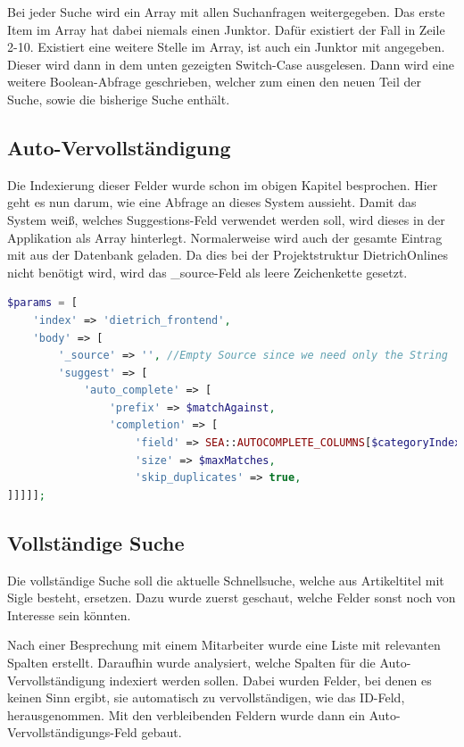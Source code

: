 Bei jeder Suche wird ein Array mit allen Suchanfragen weitergegeben. Das erste Item im Array hat dabei niemals einen Junktor. Dafür existiert der Fall in Zeile 2-10. Existiert eine weitere Stelle im Array, ist auch ein Junktor mit angegeben. Dieser wird dann in dem unten gezeigten Switch-Case ausgelesen. Dann wird eine weitere Boolean-Abfrage geschrieben, welcher zum einen den neuen Teil der Suche, sowie die bisherige Suche enthält.

\subsection{Auto-Vervollständigung}

Die Indexierung dieser Felder wurde schon im obigen Kapitel besprochen. Hier geht es nun darum, wie eine Abfrage an dieses System aussieht. Damit das System weiß, welches Suggestions-Feld verwendet werden soll, wird dieses in der Applikation als Array hinterlegt. Normalerweise wird auch der gesamte Eintrag mit aus der Datenbank geladen. Da dies bei der Projektstruktur DietrichOnlines nicht benötigt wird, wird das \_source-Feld als leere Zeichenkette gesetzt. \cite{ElasticsearchB.V..13.2.2020}


\begin{lstlisting}[language=PHP, frame=single, label={lst:autocompleParams}, caption=Auschnitt aus der Abfrage zur Auto-Vervollständigung,captionpos=b] 
$params = [
    'index' => 'dietrich_frontend',
    'body' => [
        '_source' => '', //Empty Source since we need only the String
        'suggest' => [
            'auto_complete' => [
                'prefix' => $matchAgainst,
                'completion' => [
                    'field' => SEA::AUTOCOMPLETE_COLUMNS[$categoryIndex],
                    'size' => $maxMatches,
                    'skip_duplicates' => true,
]]]]];
\end{lstlisting}

\subsection{Vollständige Suche}

Die vollständige Suche soll die aktuelle Schnellsuche, welche aus Artikeltitel mit Sigle besteht, ersetzen. Dazu wurde zuerst geschaut, welche Felder sonst noch von Interesse sein könnten. 

Nach einer Besprechung mit einem Mitarbeiter wurde eine Liste mit relevanten Spalten erstellt. Daraufhin wurde analysiert, welche Spalten für die Auto-Vervollständigung indexiert werden sollen. Dabei wurden Felder, bei denen es keinen Sinn ergibt, sie automatisch zu vervollständigen, wie das ID-Feld, herausgenommen. Mit den verbleibenden Feldern wurde dann ein Auto-Vervollständigungs-Feld gebaut.

